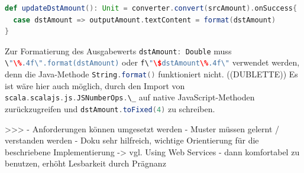 \documentclass[a4paper, 12pt, hidelinks, listof=totoc, listoftables=totoc, bibliography=totoc]{scrreprt}
\newcommand{\scala}[1]{\lstinline[language=Scala, style=inline]|#1|}
\begin{document}
\begin{lstlisting}[language=Scala, style=snippet]
def updateDstAmount(): Unit = converter.convert(srcAmount).onSuccess{
  case dstAmount => outputAmount.textContent = format(dstAmount)
}
\end{lstlisting}

Zur Formatierung des Ausgabewerts \scala{dstAmount: Double} muss \scala{\"\%.4f\".format(dstAmount)} oder \scala{f\"\$dstAmount\%.4f\"} verwendet werden, denn die Java-Methode \scala{String.format()} funktioniert nicht. ((DUBLETTE)) Es ist wäre hier auch möglich, durch den Import von \scala{scala.scalajs.js.JSNumberOps.\_}
auf native JavaScript-Methoden zurückzugreifen und \scala{dstAmount.toFixed(4)} zu schreiben.

>>>
- Anforderungen können umgesetzt werden
- Muster müssen gelernt / verstanden werden
- Doku sehr hilfreich, wichtige Orientierung für die beschriebene Implementierung -> vgl. Using Web Services \cite[\#UsingWebServices]{haoyi.HOS}
- dann komfortabel zu benutzen, erhöht Lesbarkeit durch Prägnanz




%
\end{document}
